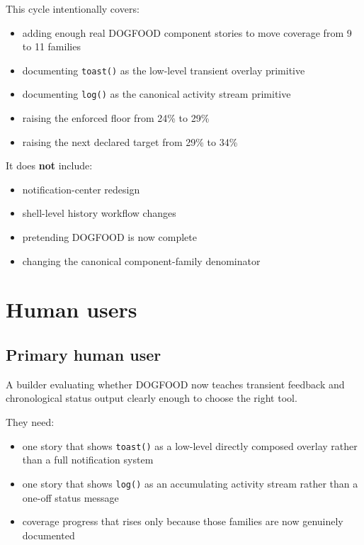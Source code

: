 This cycle intentionally covers:

\begin{itemize}
\tightlist
\item
  adding enough real DOGFOOD component stories to move coverage from 9 to 11 families
\item
  documenting \texttt{t\allowbreak{}o\allowbreak{}a\allowbreak{}s\allowbreak{}t\allowbreak{}(\allowbreak{})} as the low-level transient overlay primitive
\item
  documenting \texttt{l\allowbreak{}o\allowbreak{}g\allowbreak{}(\allowbreak{})} as the canonical activity stream primitive
\item
  raising the enforced floor from 24\% to 29\%
\item
  raising the next declared target from 29\% to 34\%
\end{itemize}

It does \textbf{not} include:

\begin{itemize}
\tightlist
\item
  notification-center redesign
\item
  shell-level history workflow changes
\item
  pretending DOGFOOD is now complete
\item
  changing the canonical component-family denominator
\end{itemize}

\section{Human users}\label{record-069-human-users}

\subsection{Primary human user}\label{record-069-primary-human-user}

A builder evaluating whether DOGFOOD now teaches transient feedback and chronological status output clearly enough to choose the right tool.

They need:

\begin{itemize}
\tightlist
\item
  one story that shows \texttt{t\allowbreak{}o\allowbreak{}a\allowbreak{}s\allowbreak{}t\allowbreak{}(\allowbreak{})} as a low-level directly composed overlay rather than a full notification system
\item
  one story that shows \texttt{l\allowbreak{}o\allowbreak{}g\allowbreak{}(\allowbreak{})} as an accumulating activity stream rather than a one-off status message
\item
  coverage progress that rises only because those families are now genuinely documented
\end{itemize}

